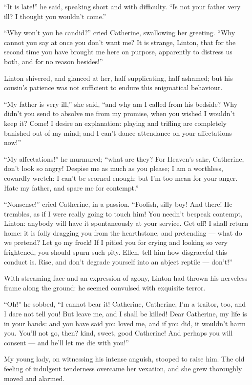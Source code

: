 \par “It is late!” he said, speaking short and with difficulty. “Is not your father very ill? I thought you wouldn't come.”
\par “Why won't you be candid?” cried Catherine, swallowing her greeting. “Why cannot you say at once you don't want me? It is strange, Linton, that for the second time you have brought me here on purpose, apparently to distress us both, and for no reason besides!”
\par Linton shivered, and glanced at her, half supplicating, half ashamed; but his cousin's patience was not sufficient to endure this enigmatical behaviour.
\par “My father is very ill,” she said, “and why am I called from his bedside? Why didn't you send to absolve me from my promise, when you wished I wouldn't keep it? Come! I desire an explanation: playing and trifling are completely banished out of my mind; and I can't dance attendance on your affectations now!”
\par “My affectations!” he murmured; “what are they? For Heaven's sake, Catherine, don't look so angry! Despise me as much as you please; I am a worthless, cowardly wretch: I can't be scorned enough; but I'm too mean for your anger. Hate my father, and spare me for contempt.”
\par “Nonsense!” cried Catherine, in a passion. “Foolish, silly boy! And there! He trembles, as if I were really going to touch him! You needn't bespeak contempt, Linton: anybody will have it spontaneously at your service. Get off! I shall return home: it is folly dragging you from the hearthstone, and pretending — what do we pretend? Let go my frock! If I pitied you for crying and looking so very frightened, you should spurn such pity. Ellen, tell him how disgraceful this conduct is. Rise, and don't degrade yourself into an abject reptile — don't!”
\par With streaming face and an expression of agony, Linton had thrown his nerveless frame along the ground: he seemed convulsed with exquisite terror.
\par “Oh!” he sobbed, “I cannot bear it! Catherine, Catherine, I'm a traitor, too, and I dare not tell you! But leave me, and I shall be killed! Dear Catherine, my life is in your hands: and you have said you loved me, and if you did, it wouldn't harm you. You'll not go, then? kind, sweet, good Catherine! And perhaps you will consent — and he'll let me die with you!”
\par My young lady, on witnessing his intense anguish, stooped to raise him. The old feeling of indulgent tenderness overcame her vexation, and she grew thoroughly moved and alarmed.
